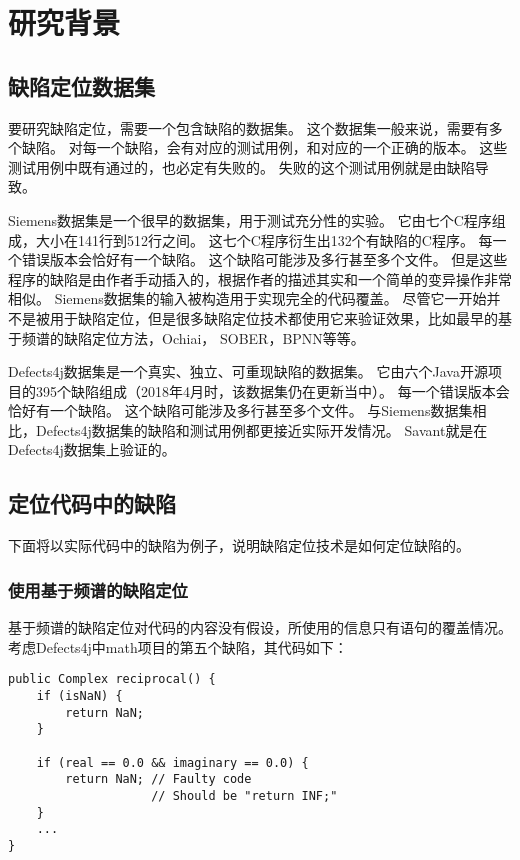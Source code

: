 \chapter{研究背景}

\section{缺陷定位数据集}

要研究缺陷定位，需要一个包含缺陷的数据集。
这个数据集一般来说，需要有多个缺陷。
对每一个缺陷，会有对应的测试用例，和对应的一个正确的版本。
这些测试用例中既有通过的，也必定有失败的。
失败的这个测试用例就是由缺陷导致。

Siemens数据集\parencite{Hutchins1994Experiments}是一个很早的数据集，用于测试充分性的实验。
它由七个C程序组成，大小在141行到512行之间。
这七个C程序衍生出132个有缺陷的C程序。
每一个错误版本会恰好有一个缺陷。
这个缺陷可能涉及多行甚至多个文件。
但是这些程序的缺陷是由作者手动插入的，根据作者的描述其实和一个简单的变异操作非常相似。
Siemens数据集的输入被构造用于实现完全的代码覆盖。
尽管它一开始并不是被用于缺陷定位，但是很多缺陷定位技术都使用它来验证效果，比如最早的基于频谱的缺陷定位方法\parencite{Renieres2003Fault}，Ochiai\parencite{Abreu2006An,Abreu2007On}，
SOBER\parencite{Liu2006Statistical}，BPNN\parencite{W2009BP}等等。

Defects4j数据集\parencite{Just2014Defects4J}是一个真实、独立、可重现缺陷的数据集。
它由六个Java开源项目的395个缺陷组成（2018年4月时，该数据集仍在更新当中）。
每一个错误版本会恰好有一个缺陷。
这个缺陷可能涉及多行甚至多个文件。
与Siemens数据集相比，Defects4j数据集的缺陷和测试用例都更接近实际开发情况。
Savant\parencite{Le2016A}就是在Defects4j数据集上验证的。

\section{定位代码中的缺陷}

下面将以实际代码中的缺陷为例子，说明缺陷定位技术是如何定位缺陷的。

\subsection{使用基于频谱的缺陷定位}

基于频谱的缺陷定位对代码的内容没有假设，所使用的信息只有语句的覆盖情况。
考虑Defects4j中math项目的第五个缺陷，其代码如下：
\lstset{language=Java}
\begin{lstlisting}
public Complex reciprocal() {
    if (isNaN) {
        return NaN;
    }

    if (real == 0.0 && imaginary == 0.0) {
        return NaN; // Faulty code
                    // Should be "return INF;"
    }
    ...
}
\end{lstlisting}

